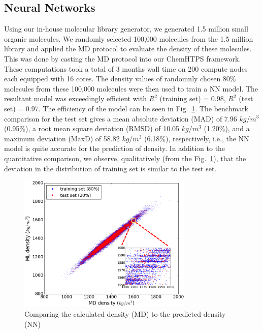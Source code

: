 \subsection{Neural Networks}
\label{subsec:NN_results} 

Using our in-house molecular library generator, we generated 1.5 million small organic molecules. We randomly selected 100,000 molecules from the 1.5 million library and applied the MD protocol to evaluate the density of these molecules. This was done by casting the MD protocol into our ChemHTPS framework. These computations took a total of 3 months wall time on 200 compute nodes each equipped with 16 cores. The density values of randomnly chosen 80\% molecules from these 100,000 molecules were then used to train a NN model.  The resultant model was exceedingly efficient with $R^2$ (training set) = 0.98, $R^2$ (test set) = 0.97. The efficiency of the model can be seen in Fig.\ \ref{fig:MD_NN}. The benchmark comparison for the test set gives a mean absolute deviation (MAD) of 7.96 $kg/m^3$ (0.95\%), a root mean square deviation (RMSD) of 10.05 $kg/m^3$ (1.20\%), and a maximum deviation (MaxD) of 58.82 $kg/m^3$ (6.18\%), respectively, i.e., the NN model is quite accurate for the prediction of density. In addition to the quantitative comparison, we observe, qualitatively (from the Fig.\ \ref{fig:MD_NN}), that the deviation in the distribution of training set is similar to the test set. %

\begin{figure}[htbp] 
	\centering
	\includegraphics[width=0.744\textwidth]{Chapter-6/Figures/Comparison_MD_NN.eps}
	\caption{Comparing the calculated density (MD) to the predicted density (NN)}
	\label{fig:MD_NN} 
\end{figure} 

